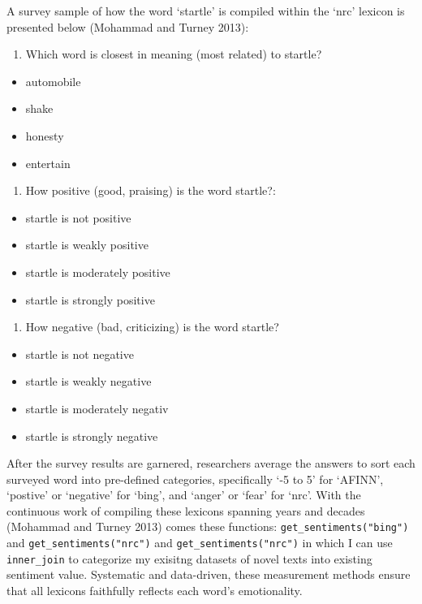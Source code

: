 \documentclass[
  letterpaper,
  DIV=11,
  numbers=noendperiod]{scrartcl}
\providecommand{\tightlist}{%
  \setlength{\itemsep}{0pt}\setlength{\parskip}{0pt}}\usepackage{longtable,booktabs,array}
\begin{document}
A survey sample of how the word `startle' is compiled within the `nrc'
lexicon is presented below (Mohammad and Turney 2013):

\begin{enumerate}
\def\labelenumi{(\arabic{enumi})}
\tightlist
\item
  Which word is closest in meaning (most related) to startle?
\end{enumerate}

\begin{itemize}
\tightlist
\item
  automobile
\item
  shake
\item
  honesty
\item
  entertain
\end{itemize}

\begin{enumerate}
\def\labelenumi{(\arabic{enumi})}
\setcounter{enumi}{1}
\tightlist
\item
  How positive (good, praising) is the word startle?:
\end{enumerate}

\begin{itemize}
\tightlist
\item
  startle is not positive
\item
  startle is weakly positive
\item
  startle is moderately positive
\item
  startle is strongly positive
\end{itemize}

\begin{enumerate}
\def\labelenumi{(\arabic{enumi})}
\setcounter{enumi}{2}
\tightlist
\item
  How negative (bad, criticizing) is the word startle?
\end{enumerate}

\begin{itemize}
\tightlist
\item
  startle is not negative
\item
  startle is weakly negative
\item
  startle is moderately negativ
\item
  startle is strongly negative
\end{itemize}

After the survey results are garnered, researchers average the answers
to sort each surveyed word into pre-defined categories, specifically `-5
to 5' for `AFINN', `postive' or `negative' for `bing', and `anger' or
`fear' for `nrc'. With the continuous work of compiling these lexicons
spanning years and decades (Mohammad and Turney 2013) comes these
functions: \texttt{get\_sentiments("bing")} and
\texttt{get\_sentiments("nrc")} and \texttt{get\_sentiments("nrc")} in
which I can use \texttt{inner\_join} to categorize my exisitng datasets
of novel texts into existing sentiment value. Systematic and
data-driven, these measurement methods ensure that all lexicons
faithfully reflects each word's emotionality.
\end{document}
